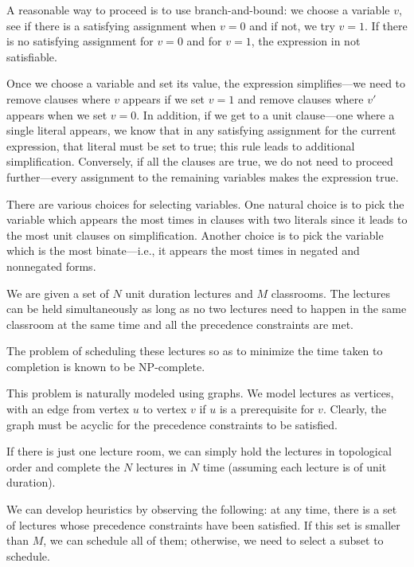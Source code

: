 A reasonable way to proceed is to use branch-and-bound: we choose a variable
$v$, see if there is a satisfying assignment when $v=0$ and if not,
we try $v=1$. If there is no satisfying assignment for $v=0$ and
for $v=1$, the expression in not satisfiable.

Once we choose a variable and set its value, the expression simplifies---we
need to remove clauses where $v$ appears
if we set $v=1$ and remove clauses where $v'$ appears when we set $v=0$.
In addition, if we get to a unit clause---one where a single literal appears,
we know that in any satisfying assignment for 
the current expression, that literal must be set to true; this rule
leads to additional simplification.  Conversely, if all the clauses are true,
we do not need to proceed further---every assignment to the remaining variables
makes the expression true.

There are various choices for selecting variables. One natural choice
is to pick the variable which appears the most times in clauses with
two literals since it leads to the most unit clauses on simplification.
Another choice is to pick the variable which is the most binate---i.e., it appears
the most times in negated and nonnegated forms.



We are given a set of $N$ unit duration lectures and $M$ classrooms. The lectures can be held simultaneously as long as no two lectures need to happen in the same classroom at the same time and all the 
precedence constraints are met. 

The problem of scheduling 
these lectures  so as to minimize the time taken to completion is known
to be NP-complete.

This problem is naturally modeled using graphs.  We model
lectures as vertices, with an edge from vertex $u$ to vertex $v$ if
$u$ is a prerequisite for $v$.  Clearly, the graph must be acyclic for
the precedence constraints to be satisfied.

If there is just one lecture room, we can simply hold the lectures
in topological order and complete the $N$ lectures in $N$ time (assuming
each lecture is of unit duration).

We can develop heuristics by observing the following: at any time, there
is a set of lectures whose precedence constraints have been satisfied.
If this set is smaller than $M$, we can schedule all of them;
otherwise, we need to select a subset to schedule.

